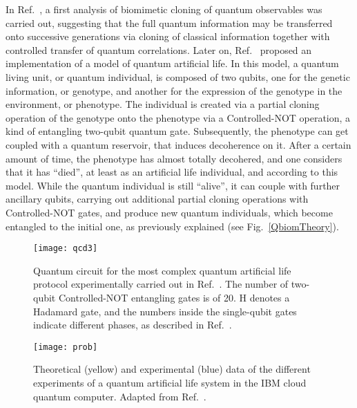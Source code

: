 \documentclass[12pt]{iopart}
\begin{document}
In Ref.~\cite{qubiom1}, a first analysis of biomimetic cloning of quantum observables was carried out, suggesting that the full quantum information may be transferred onto successive generations via cloning of classical information together with controlled transfer of quantum correlations. Later on, Ref.~\cite{qubiom2} proposed an implementation of a model of quantum artificial life. In this model, a quantum living unit, or quantum individual, is composed of two qubits, one for the genetic information, or genotype, and another for the expression of the genotype in the environment, or phenotype. The individual is created via a partial cloning operation of the genotype onto the phenotype via a Controlled-NOT operation, a kind of entangling two-qubit quantum gate. Subsequently, the phenotype can get coupled with a quantum reservoir, that induces decoherence on it. After a certain amount of time, the phenotype has almost totally decohered, and one considers that it has ``died'', at least as an artificial life individual, and according to this model. While the quantum individual is still ``alive'', it can couple with further ancillary qubits, carrying out additional partial cloning operations with Controlled-NOT gates, and produce new quantum individuals, which become entangled to the initial one, as previously explained (see Fig.~\ref{QbiomTheory}).



\begin{figure}[h!]
\begin{center}
\texttt{[image: qcd3]}
\caption{Quantum circuit for the most complex quantum artificial life protocol experimentally carried out in Ref.~\cite{qubiom3}. The number of two-qubit Controlled-NOT entangling gates is of 20. H denotes a Hadamard gate, and the numbers inside the single-qubit gates indicate different phases, as described in Ref.~\cite{qubiom3}.}
\label{qcd3}
\end{center}
\end{figure}



\begin{figure}[h!]
\begin{center}
\texttt{[image: prob]}
\caption{Theoretical (yellow) and experimental (blue) data of the different experiments of a quantum artificial life system in the IBM cloud quantum computer. Adapted from Ref.~\cite{qubiom3}.}
\label{QbiomExp}
\end{center}
\end{figure} 
\end{document}
